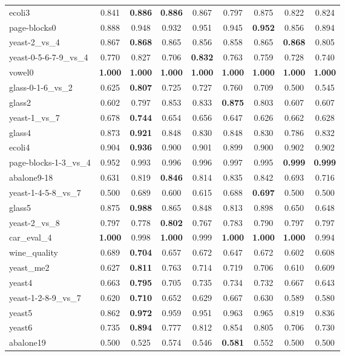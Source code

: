 \begin{table}[!htbp]
{\begin{tabular}{lcccccccc}
			ecoli3 & 0.841 & \textbf{0.886} & \textbf{0.886} & 0.867 & 0.797 & 0.875 & 0.822 & 0.824 \\
			page-blocks0 & 0.888 & 0.948 & 0.932 & 0.951 & 0.945 & \textbf{0.952} & 0.856 & 0.894 \\
			yeast-2\_vs\_4 & 0.867 & \textbf{0.868} & 0.865 & 0.856 & 0.858 & 0.865 & \textbf{0.868} & 0.805 \\
			yeast-0-5-6-7-9\_vs\_4 & 0.770 & 0.827 & 0.706 & \textbf{0.832} & 0.763 & 0.759 & 0.728 & 0.740 \\
			vowel0 & \textbf{1.000} & \textbf{1.000} & \textbf{1.000} & \textbf{1.000} & \textbf{1.000} & \textbf{1.000} & \textbf{1.000} & \textbf{1.000} \\
			glass-0-1-6\_vs\_2 & 0.625 & \textbf{0.807} & 0.725 & 0.727 & 0.760 & 0.709 & 0.500 & 0.545 \\
			glass2 & 0.602 & 0.797 & 0.853 & 0.833 & \textbf{0.875} & 0.803 & 0.607 & 0.607 \\
			yeast-1\_vs\_7 & 0.678 & \textbf{0.744} & 0.654 & 0.656 & 0.647 & 0.626 & 0.662 & 0.628 \\
			glass4 & 0.873 & \textbf{0.921} & 0.848 & 0.830 & 0.848 & 0.830 & 0.786 & 0.832 \\
			ecoli4 & 0.904 & \textbf{0.936} & 0.900 & 0.901 & 0.899 & 0.900 & 0.902 & 0.902 \\
			page-blocks-1-3\_vs\_4 & 0.952 & 0.993 & 0.996 & 0.996 & 0.997 & 0.995 & \textbf{0.999} & \textbf{0.999} \\
			abalone9-18 & 0.631 & 0.819 & \textbf{0.846} & 0.814 & 0.835 & 0.842 & 0.693 & 0.716 \\
			yeast-1-4-5-8\_vs\_7 & 0.500 & 0.689 & 0.600 & 0.615 & 0.688 & \textbf{0.697} & 0.500 & 0.500 \\
			glass5 & 0.875 & \textbf{0.988} & 0.865 & 0.848 & 0.813 & 0.898 & 0.650 & 0.648 \\
			yeast-2\_vs\_8 & 0.797 & 0.778 & \textbf{0.802} & 0.767 & 0.783 & 0.790 & 0.797 & 0.797 \\
			car\_eval\_4 & \textbf{1.000} & 0.998 & \textbf{1.000} & 0.999 & \textbf{1.000} & \textbf{1.000} & \textbf{1.000} & 0.994 \\
			wine\_quality & 0.689 & \textbf{0.704} & 0.657 & 0.672 & 0.647 & 0.672 & 0.602 & 0.608 \\
			yeast\_me2 & 0.627 & \textbf{0.811} & 0.763 & 0.714 & 0.719 & 0.706 & 0.610 & 0.609 \\
			yeast4 & 0.663 & \textbf{0.795} & 0.705 & 0.735 & 0.734 & 0.732 & 0.667 & 0.643 \\
			yeast-1-2-8-9\_vs\_7 & 0.620 & \textbf{0.710} & 0.652 & 0.629 & 0.667 & 0.630 & 0.589 & 0.580 \\
			yeast5 & 0.862 & \textbf{0.972} & 0.959 & 0.951 & 0.963 & 0.965 & 0.819 & 0.836 \\
			yeast6 & 0.735 & \textbf{0.894} & 0.777 & 0.812 & 0.854 & 0.805 & 0.706 & 0.730 \\
			abalone19 & 0.500 & 0.525 & 0.574 & 0.546 & \textbf{0.581} & 0.552 & 0.500 & 0.500 \\
			\bottomrule
		\end{tabular}%
		
}
\end{table}
